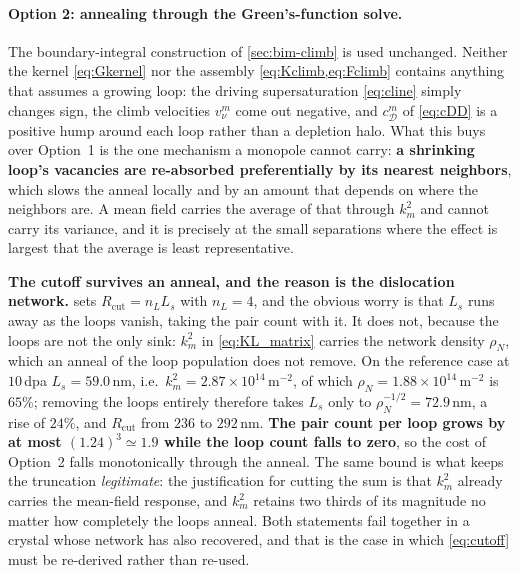 \documentclass{article}
\begin{document}
\paragraph{Option 2: annealing through the Green's-function solve.} The
boundary-integral construction of \cref{sec:bim-climb} is used unchanged. Neither
the kernel \cref{eq:Gkernel} nor the assembly \cref{eq:Kclimb,eq:Fclimb} contains
anything that assumes a growing loop: the driving supersaturation
\cref{eq:cline} simply changes sign, the climb velocities $v^m_\nu$ come out
negative, and $c^m_{\mathcal D}$ of \cref{eq:cDD} is a positive hump around each
loop rather than a depletion halo. What this buys over Option~1 is the one
mechanism a monopole cannot carry: \textbf{a shrinking loop's vacancies are
re-absorbed preferentially by its nearest neighbors}, which slows the anneal
locally and by an amount that depends on where the neighbors are. A mean field
carries the average of that through $k^2_m$ and cannot carry its variance, and it
is precisely at the small separations where the effect is largest that the
average is least representative.

\textbf{The cutoff survives an anneal, and the reason is the dislocation
network.}  sets $R_{\mathrm{cut}}=n_LL_s$ with $n_L=4$, and the
obvious worry is that $L_s$ runs away as the loops vanish, taking the pair count
with it. It does not, because the loops are not the only sink: $k^2_m$ in
\cref{eq:KL_matrix} carries the network density $\rho_N$, which an anneal of the
loop population does not remove. On the reference case at $10\,$dpa
$L_s=59.0\,$nm, i.e.\ $k^2_m=2.87\times10^{14}\,$m$^{-2}$, of which
$\rho_N=1.88\times10^{14}\,$m$^{-2}$ is $65\%$; removing the loops entirely
therefore takes $L_s$ only to $\rho_N^{-1/2}=72.9\,$nm, a rise of $24\%$, and
$R_{\mathrm{cut}}$ from $236$ to $292\,$nm. \textbf{The pair count per loop grows
by at most $(1.24)^3\simeq1.9$ while the loop count falls to zero}, so the cost
of Option~2 falls monotonically through the anneal. The same bound is what keeps
the truncation \emph{legitimate}: the justification for cutting the sum is that
$k^2_m$ already carries the mean-field response, and $k^2_m$ retains two thirds
of its magnitude no matter how completely the loops anneal. Both statements fail
together in a crystal whose network has also recovered, and that is the case in
which \cref{eq:cutoff} must be re-derived rather than re-used.
\end{document}
